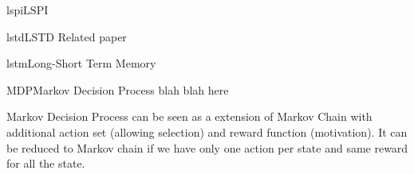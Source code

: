 \documentclass[9pt]{article}
\begin{document}
\begin{topic}{lspi}{LSPI}
\Working
\end{topic}

\begin{topic}{lstd}{LSTD}
\Working
Related paper
\end{topic}

\begin{topic}{lstm}{Long-Short Term Memory}
\Working
\end{topic}

\begin{topic}{MDP}{Markov Decision Process}
blah blah here

Markov Decision Process can be seen as a extension of Markov Chain with additional action set (allowing selection) and reward function (motivation). It can be reduced to Markov chain if we have only one action per state and same reward for all the state.
\end{topic}
\end{document}
